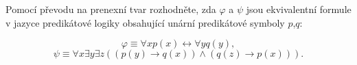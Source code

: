 Pomocí převodu na prenexní tvar rozhodněte, zda $\varphi$ a $\psi$ jsou
ekvivalentní formule v jazyce predikátové logiky obsahující unární predikátové
symboly $p$,$q$:

$$\varphi \equiv \forall xp(x)\leftrightarrow \forall yq(y),$$
$$\psi \equiv \forall x\exists y \exists z ((p(y)\rightarrow q(x))\wedge (q(z)\rightarrow p(x))).$$
